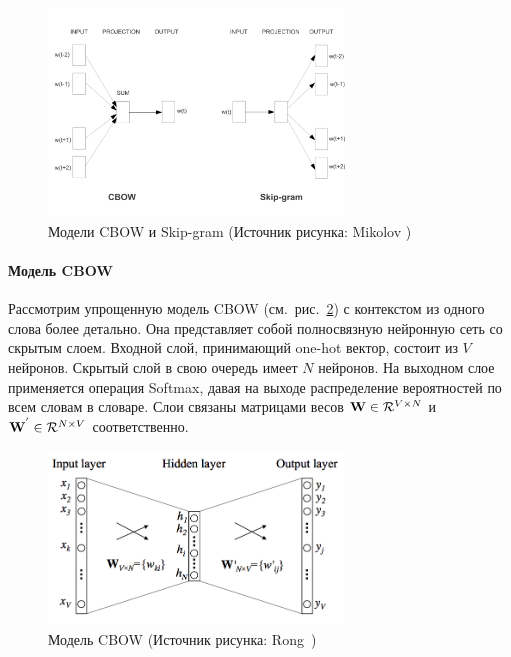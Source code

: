 \begin{figure}[ht]
\centering
\includegraphics[width=0.7\textwidth]{img/efficient-models}
\caption{\label{fig:w2v-models}Модели CBOW и Skip-gram (Источник рисунка: Mikolov \autocite{DBLP:journals/corr/abs-1301-3781})}
\end{figure}

\paragraph{Модель CBOW} Рассмотрим упрощенную модель CBOW (см.~рис.~\ref{fig:w2v-cbow}) с контекстом из одного слова более детально. Она представляет собой полносвязную нейронную сеть со скрытым слоем. Входной слой, принимающий one-hot вектор, состоит из ${V}$ нейронов. Скрытый слой в свою очередь имеет ${N}$ нейронов. На выходном слое применяется операция Softmax, давая на выходе распределение вероятностей по всем словам в словаре. Слои связаны матрицами весов ${\textbf W} \in \mathcal{R}^{V \times N } $ и ${\textbf W^{'}} \in \mathcal{R}^{N \times V}$ соответственно.

\begin{figure}[ht]
\centering
\includegraphics[width=0.7\textwidth]{img/CBOW.png}
\caption{\label{fig:w2v-cbow}Модель CBOW (Источник рисунка: Rong~\autocite{Rong2014word2vecPL})}
\end{figure}


